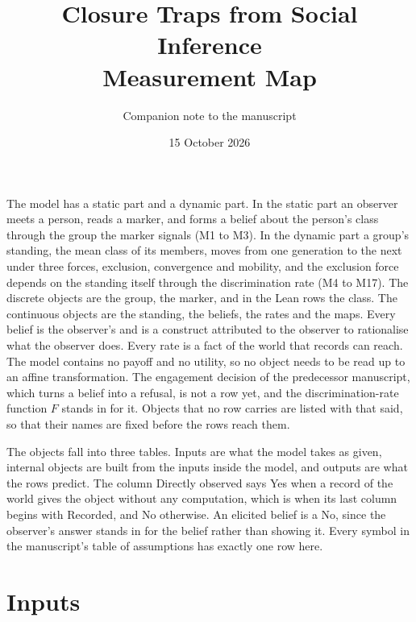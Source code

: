 \documentclass[11pt]{article}
\title{Closure Traps from Social Inference\\ Measurement Map}
\author{Companion note to the manuscript}
\date{15 October 2026}
\begin{document}
\maketitle

\noindent The model has a static part and a dynamic part. In the static part
an observer meets a person, reads a marker, and forms a belief about the
person's class through the group the marker signals (M1 to M3). In the
dynamic part a group's standing, the mean class of its members, moves from
one generation to the next under three forces, exclusion, convergence and
mobility, and the exclusion force depends on the standing itself through the
discrimination rate (M4 to M17). The discrete objects are the group, the
marker, and in the Lean rows the class. The continuous objects are the
standing, the beliefs, the rates and the maps. Every belief is the observer's
and is a construct attributed to the observer to rationalise what the
observer does. Every rate is a fact of the world that records can reach. The
model contains no payoff and no utility, so no object needs to be read up to
an affine transformation. The engagement decision of the predecessor
manuscript, which turns a belief into a refusal, is not a row yet, and the
discrimination-rate function $F$ stands in for it. Objects that no row
carries are listed with that said, so that their names are fixed before the
rows reach them.

The objects fall into three tables. Inputs are what the model takes as given,
internal objects are built from the inputs inside the model, and outputs are
what the rows predict. The column Directly observed says Yes when a record of
the world gives the object without any computation, which is when its last
column begins with Recorded, and No otherwise. An elicited belief is a No,
since the observer's answer stands in for the belief rather than showing it.
Every symbol in the manuscript's table of assumptions has exactly one row
here.

\section*{Inputs}
\end{document}
